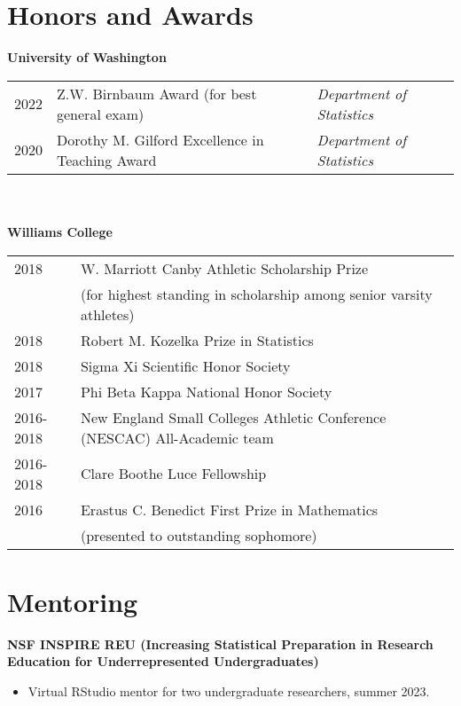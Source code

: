 \documentclass[margin, 10pt]{res} %
\begin{document}
\begin{resume}
\section{Honors and Awards}
\textbf{University of Washington} \\
\begin{tabular}{l l l}
2022 & Z.W. Birnbaum Award (for best general exam) & \emph{Department of Statistics} \\
2020 & Dorothy M. Gilford Excellence in Teaching Award & \emph{Department of Statistics}
\end{tabular}  \\
\\
\textbf{Williams College} \\
\begin{tabular}{l l }
2018 & W. Marriott Canby Athletic Scholarship Prize   \\
& (for highest standing in scholarship among senior varsity athletes) \\
2018 & Robert M. Kozelka Prize in Statistics   \\
2018&  Sigma Xi Scientific Honor Society \\
2017 & Phi Beta Kappa  National Honor Society \\
2016-2018 & New England Small Colleges Athletic Conference (NESCAC) All-Academic team \\
2016-2018 & Clare Boothe Luce Fellowship \\
2016 & Erastus C. Benedict First Prize in Mathematics \\
& (presented to outstanding sophomore) \\
\end{tabular}

\section{Mentoring}
{\textbf{NSF INSPIRE REU (Increasing Statistical Preparation in Research Education for Underrepresented Undergraduates)}}
\begin{itemize}
\item Virtual RStudio mentor for two undergraduate researchers, summer 2023. 
\end{itemize}



\end{resume}
\end{document}
